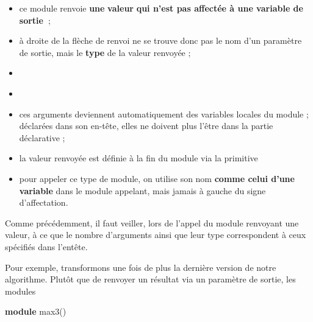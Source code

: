 \liststyleListv
\begin{itemize}
\item {
{ce module renvoie
}{\textbf{une}}{
}{\textbf{valeur}}{
}{\textbf{qui n’est pas affectée à une variable
de
}}{\textbf{sortie~}}{;}}
\item {
{à droite de la flèche de renvoi ne se trouve
donc pas le nom d’un paramètre de sortie, mais le
}{\textbf{type}}{ de la
valeur renvoyée ;}}
\item {
}
\item {
}
\item {
ces arguments deviennent automatiquement des variables locales du module
; déclarées dans son en-tête, elles ne doivent plus l’être dans la
partie déclarative ;}
\item {
{la valeur renvoyée est définie à la fin du
module via la primitive
}}
\item {
pour appeler ce type de module, on utilise son nom \textbf{comme celui
d’une variable} dans le module appelant, mais jamais à gauche du signe
d’affectation.}
\end{itemize}
{
Comme précédemment, il faut veiller, lors de l’appel du module renvoyant
une valeur, à ce que le nombre d’arguments ainsi que leur type
correspondent à ceux spécifiés dans l’entête.}

{
{Pour exemple, transformons une fois de plus la
dernière version de notre algorithme. Plutôt que de renvoyer un
résultat via un paramètre de sortie, les modules
}}

{\sffamily
\textbf{module} max3()}

